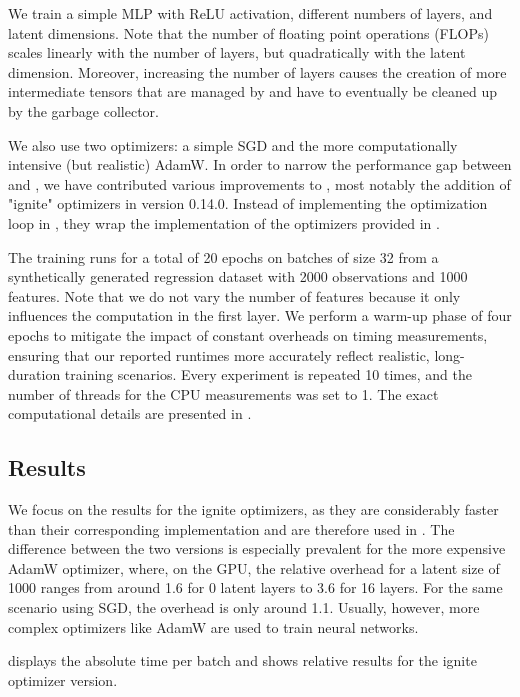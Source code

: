 \documentclass[article]{jss}
\theoremstyle{definition}
\begin{document}
We train a simple MLP with ReLU activation, different numbers of layers, and latent dimensions.
Note that the number of floating point operations (FLOPs) scales linearly with the number of layers, but quadratically with the latent dimension.
Moreover, increasing the number of layers causes the creation of more intermediate tensors that are managed by \rlang{} and have to eventually be cleaned up by the \rlang{} garbage collector.

We also use two optimizers: a simple SGD and the more computationally intensive (but realistic) AdamW.
In order to narrow the performance gap between \torch{} and \pytorch{}, we have contributed various improvements to \torch{}, most notably the addition of "ignite" optimizers in \torch{} version 0.14.0.
Instead of implementing the optimization loop in \rlang{}, they wrap the \cpp{} implementation of the optimizers provided in \libtorch{}.

The training runs for a total of 20 epochs on batches of size 32 from a synthetically generated regression dataset with 2000 observations and 1000 features.
Note that we do not vary the number of features because it only influences the computation in the first layer.
We perform a warm-up phase of four epochs to mitigate the impact of constant overheads on timing measurements, ensuring that our reported runtimes more accurately reflect realistic, long-duration training scenarios.
Every experiment is repeated 10 times, and the number of threads for the CPU measurements was set to 1.
The exact computational details are presented in .

\subsection{Results}

We focus on the results for the ignite optimizers, as they are considerably faster than their corresponding \rlang{} implementation and are therefore used in \mlrttorch{}.
The difference between the two versions is especially prevalent for the more expensive AdamW optimizer, where, on the GPU, the relative overhead for a latent size of 1000 ranges from around 1.6 for 0 latent layers to 3.6 for 16 layers.
For the same scenario using SGD, the overhead is only around 1.1.
Usually, however, more complex optimizers like AdamW are used to train neural networks.

 displays the absolute time per batch and  shows relative results for the ignite optimizer version.
\end{document}

